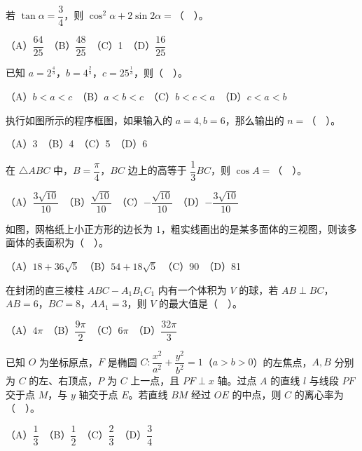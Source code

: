 \begin{question}
若 \(\tan\alpha=\dfrac34\)，则 \(\cos^2\alpha+2\sin 2\alpha=\)（　）。

（A）\(\dfrac{64}{25}\)　（B）\(\dfrac{48}{25}\)　（C）1　（D）\(\dfrac{16}{25}\)

\end{question}
\begin{question}
已知 \(a=2^{\frac43}\)，\(b=4^{\frac25}\)，\(c=25^{\frac13}\)，则（　）。

（A）\(b<a<c\)　（B）\(a<b<c\)　（C）\(b<c<a\)　（D）\(c<a<b\)

\Needspace{0.4\textheight}
\end{question}
\begin{question}
执行如图所示的程序框图，如果输入的 \(a=4,b=6\)，那么输出的 \(n=\)（　）。

（A）3　（B）4　（C）5　（D）6
\nopagebreak[4]
\begin{center}\end{center}
\nopagebreak[4]
\end{question}
\begin{question}
在 \(\triangle ABC\) 中，\(B=\dfrac\pi4\)，\(BC\) 边上的高等于 \(\dfrac13BC\)，则 \(\cos A=\)（　）。

（A）\(\dfrac{3\sqrt{10}}{10}\)　（B）\(\dfrac{\sqrt{10}}{10}\)　（C）\(-\dfrac{\sqrt{10}}{10}\)　（D）\(-\dfrac{3\sqrt{10}}{10}\)

\Needspace{0.4\textheight}
\end{question}
\begin{question}
如图，网格纸上小正方形的边长为 1，粗实线画出的是某多面体的三视图，则该多面体的表面积为（　）。

（A）\(18+36\sqrt5\)　（B）\(54+18\sqrt5\)　（C）90　（D）81
\nopagebreak[4]
\begin{center}\end{center}
\nopagebreak[4]
\end{question}
\begin{question}
在封闭的直三棱柱 \(ABC-A_1B_1C_1\) 内有一个体积为 \(V\) 的球，若 \(AB\perp BC\)，\(AB=6\)，\(BC=8\)，\(AA_1=3\)，则 \(V\) 的最大值是（　）。

（A）\(4\pi\)　（B）\(\dfrac{9\pi}{2}\)　（C）\(6\pi\)　（D）\(\dfrac{32\pi}{3}\)

\end{question}
\begin{question}
已知 \(O\) 为坐标原点，\(F\) 是椭圆 \(C:\dfrac{x^2}{a^2}+\dfrac{y^2}{b^2}=1\)（\(a>b>0\)）的左焦点，\(A,B\) 分别为 \(C\) 的左、右顶点，\(P\) 为 \(C\) 上一点，且 \(PF\perp x\) 轴。过点 \(A\) 的直线 \(l\) 与线段 \(PF\) 交于点 \(M\)，与 \(y\) 轴交于点 \(E\)。若直线 \(BM\) 经过 \(OE\) 的中点，则 \(C\) 的离心率为（　）。

（A）\(\dfrac13\)　（B）\(\dfrac12\)　（C）\(\dfrac23\)　（D）\(\dfrac34\)

\end{question}
